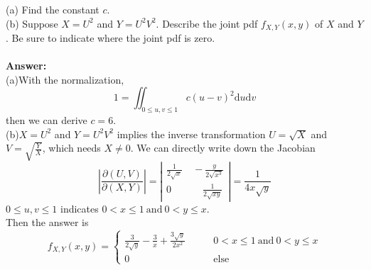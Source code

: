 \documentclass[onecolumn, 12pt]{IEEEtran}
\newcommand{\dd}{\mathrm{d}}
\begin{document}
(a) Find the constant $c$.\\
(b) Suppose $X = U^2$ and $Y = U^2V^2$. Describe the joint pdf $f_{X,Y} (x, y)$ of $X$ and $Y$. Be sure to indicate
where the joint pdf is zero.\\
\noindent
\vspace*{0.1in}\\
\noindent
{\bf Answer:}\\
\noindent (a)With the normalization,
\begin{equation*}
1=\iint_{0 \le u, v \le 1}c(u-v)^2\dd u\dd v
\end{equation*}
then we can derive $c=6$.\\
(b)$X = U^2$ and $Y = U^2V^2$ implies the inverse transformation $U=\sqrt{X}$ and $V=\sqrt{\frac{Y}{X}}$, which needs $X\ne 0$. We can directly write down the Jacobian
\begin{equation*}
\left|\frac{\partial(U,V)}{\partial(X,Y)}\right|=\left|\begin{aligned}\frac{1}{2\sqrt{x}} & \ -\frac{y}{2\sqrt{x^3}}\\ 0 & \quad\ \frac{1}{2\sqrt{xy}} \end{aligned}\right|=\frac{1}{4x\sqrt{y}}
\end{equation*}
$0 \le u, v \le 1$ indicates $0 < x \le 1 \ \mathrm{and}\   0< y\le x$.\\
Then the answer is 
\begin{equation*}
f_{X,Y}(x,y)=\left\{
\begin{aligned}
\frac{3}{2\sqrt{y}} -\frac 3x +\frac{3\sqrt{y}}{2x^2}&\qquad 0 < x \le 1 \ \mathrm{and}\   0< y\le x\\
0 \quad&\qquad\mathrm{else}
\end{aligned}
\right.
\end{equation*}
\vspace*{0.3in}
\end{document}
